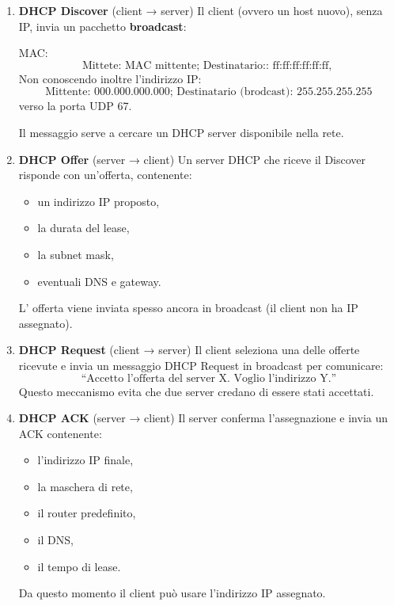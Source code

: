 \documentclass[a4paper,12pt]{report}
\begin{document}
\begin{enumerate}
    \item \textbf{DHCP Discover} (client → server)  
    Il client (ovvero un host nuovo), senza IP, invia un pacchetto \textbf{broadcast}:
    
    MAC:
    \[
    \text{Mittete: MAC mittente; Destinatario:: ff:ff:ff:ff:ff:ff, }
    
    \]
    Non conoscendo inoltre l'indirizzo IP:
    \[    
    \text{Mittente: 000.000.000.000; Destinatario (brodcast): 255.255.255.255}
    \]
    verso la porta UDP 67.  
    
    Il messaggio serve a cercare un DHCP server disponibile nella rete.

    \item \textbf{DHCP Offer} (server → client)  
    Un server DHCP che riceve il Discover risponde con un’offerta, contenente:
    \begin{itemize}
        \item un indirizzo IP proposto,
        \item la durata del lease,
        \item la subnet mask,
        \item eventuali DNS e gateway.
    \end{itemize}
    L' offerta viene inviata spesso ancora in broadcast (il client non ha IP assegnato).

    \item \textbf{DHCP Request} (client → server)  
    Il client seleziona una delle offerte ricevute  e invia un messaggio
    DHCP Request in broadcast per comunicare:
    \[
    \text{``Accetto l'offerta del server X. Voglio l’indirizzo Y.''}
    \]
    Questo meccanismo evita che due server credano di essere stati accettati.

    \item \textbf{DHCP ACK} (server → client)  
    Il server conferma l’assegnazione e invia un ACK contenente:
    \begin{itemize}
        \item l’indirizzo IP finale,
        \item la maschera di rete,
        \item il router predefinito,
        \item il DNS,
        \item il tempo di lease.
    \end{itemize}
    Da questo momento il client può usare l’indirizzo IP assegnato.
\end{enumerate}
\end{document}
